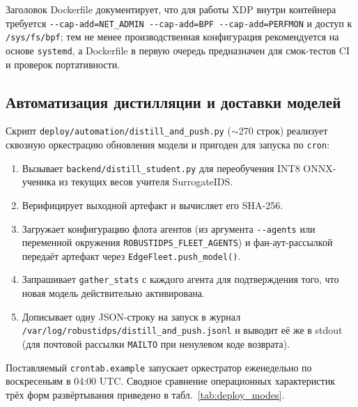 Заголовок Dockerfile документирует, что для работы XDP внутри
контейнера требуется \texttt{-{}-cap-add=NET\_ADMIN
-{}-cap-add=BPF -{}-cap-add=PERFMON} и доступ к \texttt{/sys/fs/bpf};
тем не менее производственная конфигурация рекомендуется на основе
\texttt{systemd}, а Dockerfile в первую очередь предназначен для
смок-тестов CI и проверок портативности.

\subsection{Автоматизация дистилляции и доставки моделей}

Скрипт \texttt{deploy/\allowbreak automation/\allowbreak distill\_\allowbreak and\_\allowbreak push.py} ($\sim$270
строк) реализует сквозную оркестрацию обновления модели и пригоден
для запуска по \texttt{cron}:

\begin{enumerate}\setlength\itemsep{0.18em}
\item Вызывает \texttt{backend/\allowbreak distill\_\allowbreak student.py} для переобучения
INT8 ONNX-ученика из текущих весов учителя \textsf{SurrogateIDS}.
\item Верифицирует выходной артефакт и вычисляет его SHA-256.
\item Загружает конфигурацию флота агентов (из аргумента
\texttt{-{}-agents} или переменной окружения
\texttt{ROBUSTIDPS\_\allowbreak FLEET\_\allowbreak AGENTS}) и фан-аут-рассылкой передаёт
артефакт через \texttt{EdgeFleet.push\_model()}.
\item Запрашивает \texttt{gather\_stats} с каждого агента для
подтверждения того, что новая модель действительно активирована.
\item Дописывает одну JSON-строку на запуск в журнал
\texttt{/var/log/\allowbreak robustidps/\allowbreak distill\_\allowbreak and\_\allowbreak push.\allowbreak jsonl} и выводит её же
в stdout (для почтовой рассылки \texttt{MAILTO} при ненулевом коде
возврата).
\end{enumerate}

Поставляемый \texttt{crontab.example} запускает оркестратор
еженедельно по воскресеньям в 04:00 UTC. Сводное сравнение операционных
характеристик трёх форм развёртывания приведено в
табл.~\ref{tab:deploy_modes}.

